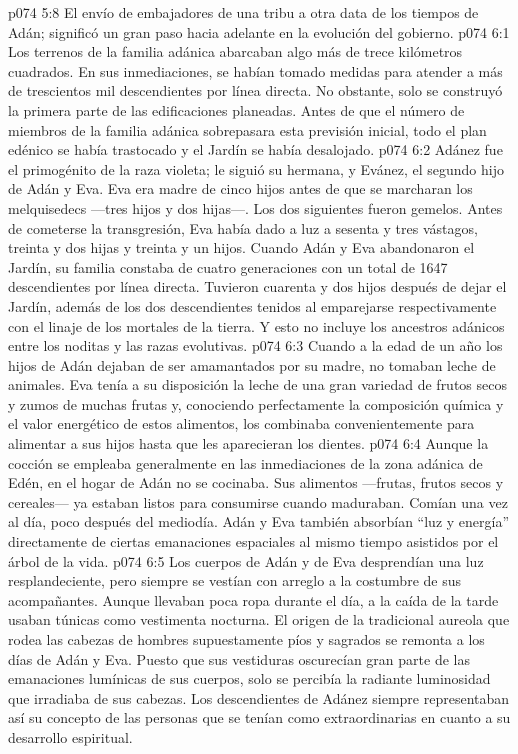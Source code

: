 \vs p074 5:8 El envío de embajadores de una tribu a otra data de los tiempos de Adán; significó un gran paso hacia adelante en la evolución del gobierno.
\vs p074 6:1 Los terrenos de la familia adánica abarcaban algo más de trece kilómetros cuadrados. En sus inmediaciones, se habían tomado medidas para atender a más de trescientos mil descendientes por línea directa. No obstante, solo se construyó la primera parte de las edificaciones planeadas. Antes de que el número de miembros de la familia adánica sobrepasara esta previsión inicial, todo el plan edénico se había trastocado y el Jardín se había desalojado.
\vs p074 6:2 \pc Adánez fue el primogénito de la raza violeta; le siguió su hermana, y Evánez, el segundo hijo de Adán y Eva. Eva era madre de cinco hijos antes de que se marcharan los melquisedecs ---tres hijos y dos hijas---. Los dos siguientes fueron gemelos. Antes de cometerse la transgresión, Eva había dado a luz a sesenta y tres vástagos, treinta y dos hijas y treinta y un hijos. Cuando Adán y Eva abandonaron el Jardín, su familia constaba de cuatro generaciones con un total de 1647 descendientes por línea directa. Tuvieron cuarenta y dos hijos después de dejar el Jardín, además de los dos descendientes tenidos al emparejarse respectivamente con el linaje de los mortales de la tierra. Y esto no incluye los ancestros adánicos entre los noditas y las razas evolutivas.
\vs p074 6:3 Cuando a la edad de un año los hijos de Adán dejaban de ser amamantados por su madre, no tomaban leche de animales. Eva tenía a su disposición la leche de una gran variedad de frutos secos y zumos de muchas frutas y, conociendo perfectamente la composición química y el valor energético de estos alimentos, los combinaba convenientemente para alimentar a sus hijos hasta que les aparecieran los dientes.
\vs p074 6:4 Aunque la cocción se empleaba generalmente en las inmediaciones de la zona adánica de Edén, en el hogar de Adán no se cocinaba. Sus alimentos ---frutas, frutos secos y cereales--- ya estaban listos para consumirse cuando maduraban. Comían una vez al día, poco después del mediodía. Adán y Eva también absorbían “luz y energía” directamente de ciertas emanaciones espaciales al mismo tiempo asistidos por el árbol de la vida.
\vs p074 6:5 \pc Los cuerpos de Adán y de Eva desprendían una luz resplandeciente, pero siempre se vestían con arreglo a la costumbre de sus acompañantes. Aunque llevaban poca ropa durante el día, a la caída de la tarde usaban túnicas como vestimenta nocturna. El origen de la tradicional aureola que rodea las cabezas de hombres supuestamente píos y sagrados se remonta a los días de Adán y Eva. Puesto que sus vestiduras oscurecían gran parte de las emanaciones lumínicas de sus cuerpos, solo se percibía la radiante luminosidad que irradiaba de sus cabezas. Los descendientes de Adánez siempre representaban así su concepto de las personas que se tenían como extraordinarias en cuanto a su desarrollo espiritual.
